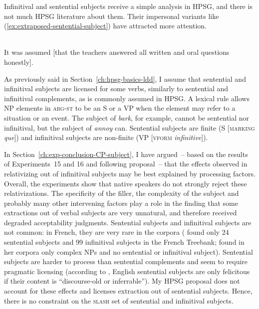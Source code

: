 Infinitival and sentential subjects receive a simple analysis in HPSG, and there is not much HPSG literature about them. Their impersonal variants like (\ref{ex:extraposed-sentential-subject}) have attracted more attention.

\ea \citep[example from COCA cited by][72]{Lee.2018}\\
It  was  assumed  [that  the  teachers  answered  all  written  and  oral questions honestly]. 
\label{ex:extraposed-sentential-subject}
\z 

As previously said in Section~\ref{ch:hpsg-basics-ldd}, I assume that sentential and infinitival subjects are licensed for some verbs, similarly to sentential and infinitival complements, as is commonly assumed in HPSG. A lexical rule allows NP elements in \textsc{arg-st} to be an S or a VP when the element may refer to a situation or an event. The subject of \emph{bark}, for example, cannot be sentential nor infinitival, but the subject of \emph{annoy} can. Sentential subjects are finite (S [\textsc{marking} \textit{que}]) and infinitival subjects are non-finite (VP [\textsc{vform} \textit{infinitive}]).

In Section~\ref{ch:exp-conclusion-CP-subject}, I have argued~-- based on the results of Experiments~15 and 16 and following  proposal~-- that the effects observed in relativizing out of infinitival subjects may be best explained by processing factors. Overall, the experiments show that native speakers do not strongly reject these relativizations. The specificity of the filler, the complexity of the subject and probably many other intervening factors play a role in the finding that some extractions out of verbal subjects are very unnatural, and therefore received degraded acceptability judgments. Sentential subjects and infinitival subjects are not common: in French, they are very rare in the corpora (\citet{Abeille.2019.FTB} found only 24 sentential subjects and 99 infinitival subjects in the French Treebank; \citet[153]{Berard.2012} found in her corpora only complex NPs and no sentential or infinitival subject). Sentential subjects are harder to process than sentential complements \citep{Frazier.1988} and seem to require pragmatic licensing (according to \citet[685]{Miller.2001}, English sentential subjects are only felicitous if their content is ``discourse-old or inferrable'').
My HPSG proposal does not account for these effects and licenses extraction out of sentential subjects. Hence, there is no constraint on the \textsc{slash} set of sentential and infinitival subjects. 

